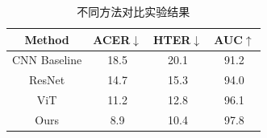 \begin{table}[H]
\centering
\caption{不同方法对比实验结果}
\begin{tabular}{cccc}
\toprule
Method & ACER$\downarrow$ & HTER$\downarrow$ & AUC$\uparrow$ \\
\midrule
CNN Baseline & 18.5 & 20.1 & 91.2 \\
ResNet & 14.7 & 15.3 & 94.0 \\
ViT & 11.2 & 12.8 & 96.1 \\
Ours & 8.9 & 10.4 & 97.8 \\
\bottomrule
\end{tabular}
\label{tab:comparison}
\end{table}
